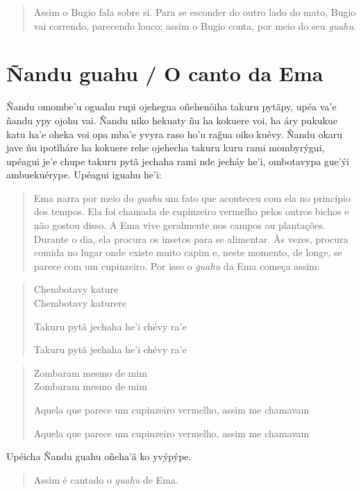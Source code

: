 \begin{quote}
Assim o Bugio fala sobre si. Para se esconder do outro lado do mato,
Bugio vai correndo, parecendo louco; assim o Bugio conta, por meio do
seu \emph{guahu}.
\end{quote}

\chapter{Ñandu guahu / O canto da Ema}

Ñandu omombe'u oguahu rupi ojehegua oñehenóiha takuru pytãpy, upéa va'e
ñandu ypy ojohu vai. Ñandu niko hekuaty ñu ha kokuere voi, ha áry
pukukue katu ha'e oheka voi opa mba'e yvyra raso ho'u rag̃ua oiko kuévy.
Ñandu okaru jave ñu ipotĩháre ha kokuere rehe ojehecha takuru kuru rami
mombyrýgui, upéagui je'e chupe takuru pytã jechaha rami nde jecháy he'i,
ombotavypa gue'ýi ambuekuérype. Upéagui iguahu he'i:

\begin{quote}
Ema narra por meio do \emph{guahu} um fato que aconteceu com ela no
princípio dos tempos. Ela foi chamada de cupinzeiro vermelho pelos
outros bichos e não gostou disso. A Ema vive geralmente nos campos ou
plantações. Durante o dia, ela procura os insetos para se alimentar. Às
vezes, procura comida no lugar onde existe muito capim e, neste momento,
de longe, se parece com um cupinzeiro. Por isso o \emph{guahu} da Ema
começa assim:
\end{quote}

\begin{verse}
Chembotavy kature\\
Chembotavy katurere

Takuru pytã jechaha he'i chévy ra'e

Takuru pytã jechaha he'i chévy ra'e
\end{verse}

\begin{verse}
Zombaram mesmo de mim\\
Zombaram mesmo de mim

Aquela que parece um cupinzeiro vermelho, assim me chamavam

Aquela que parece um cupinzeiro vermelho, assim me chamavam
\end{verse}

Upéicha Ñandu guahu oñeha'ã ko yvýpýpe.

\begin{quote}
Assim é cantado o \emph{guahu} de Ema.
\end{quote}

